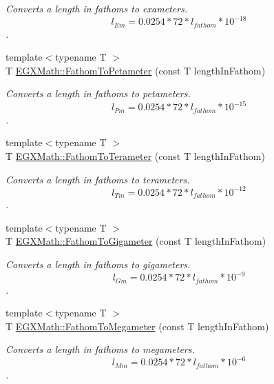 \begin{DoxyCompactItemize}
\begin{DoxyCompactList}\small\item\em Converts a length in fathoms to exameters. \[ l_{Em}=0.0254 * 72 * l_{fathom} * 10^{-18} \]. \end{DoxyCompactList}\item 
{\footnotesize template$<$typename T $>$ }\\T \mbox{\hyperlink{group___e_g_x_math-_conversions-_length_conversions-_nautical-_fathom-_s_i_ga1b39213b85524f677fed7b3d5a7052ce}{E\+G\+X\+Math\+::\+Fathom\+To\+Petameter}} (const T length\+In\+Fathom)
\begin{DoxyCompactList}\small\item\em Converts a length in fathoms to petameters. \[ l_{Pm}=0.0254 * 72 * l_{fathom} * 10^{-15} \]. \end{DoxyCompactList}\item 
{\footnotesize template$<$typename T $>$ }\\T \mbox{\hyperlink{group___e_g_x_math-_conversions-_length_conversions-_nautical-_fathom-_s_i_gade17d568b89bc6b268ca6acb38ca8863}{E\+G\+X\+Math\+::\+Fathom\+To\+Terameter}} (const T length\+In\+Fathom)
\begin{DoxyCompactList}\small\item\em Converts a length in fathoms to terameters. \[ l_{Tm}=0.0254 * 72 * l_{fathom} * 10^{-12} \]. \end{DoxyCompactList}\item 
{\footnotesize template$<$typename T $>$ }\\T \mbox{\hyperlink{group___e_g_x_math-_conversions-_length_conversions-_nautical-_fathom-_s_i_gacba836a61d9d2c6ad72195c06fab3f41}{E\+G\+X\+Math\+::\+Fathom\+To\+Gigameter}} (const T length\+In\+Fathom)
\begin{DoxyCompactList}\small\item\em Converts a length in fathoms to gigameters. \[ l_{Gm}=0.0254 * 72 * l_{fathom} * 10^{-9} \]. \end{DoxyCompactList}\item 
{\footnotesize template$<$typename T $>$ }\\T \mbox{\hyperlink{group___e_g_x_math-_conversions-_length_conversions-_nautical-_fathom-_s_i_ga143cda5a2c5c3914831736330058809b}{E\+G\+X\+Math\+::\+Fathom\+To\+Megameter}} (const T length\+In\+Fathom)
\begin{DoxyCompactList}\small\item\em Converts a length in fathoms to megameters. \[ l_{Mm}=0.0254 * 72 * l_{fathom} * 10^{-6} \]. \end{DoxyCompactList}\item 

\end{DoxyCompactItemize}
